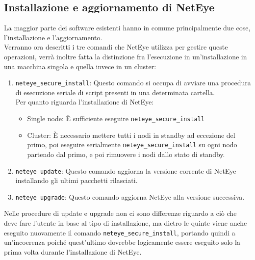 \subsection{Installazione e aggiornamento di NetEye}
\label{sub:install_update} La maggior parte dei software esistenti hanno in comune
principalmente due cose, l'installazione e l'aggiornamento.\\ Verranno ora
descritti i tre comandi che NetEye utilizza per gestire queste operazioni, verrà
inoltre fatta la distinzione fra l'esecuzione in un'installazione in una macchina
singola e quella invece in un cluster:
\begin{enumerate}
  \item \texttt{neteye\_secure\_install}: Questo comando si occupa di avviare una
    procedura di esecuzione seriale di script presenti in una determinata cartella.\\
    Per quanto riguarda l'installazione di NetEye:
    \begin{itemize}
      \item Single node: È sufficiente eseguire \texttt{neteye\_secure\_install}

      \item Cluster: È necessario mettere tutti i nodi in standby ad eccezione
        del primo, poi eseguire serialmente \texttt{neteye\_secure\_install} su
        ogni nodo partendo dal primo, e poi rimuovere i nodi dallo stato di standby.
    \end{itemize}

  \item \texttt{neteye update}: Questo comando aggiorna la versione corrente di NetEye
    installando gli ultimi pacchetti rilasciati.\\

  \item \texttt{neteye upgrade}: Questo comando aggiorna NetEye alla versione successiva.
\end{enumerate}
Nelle procedure di update e upgrade non ci sono differenze riguardo a ciò che
deve fare l'utente in base al tipo di installazione, ma dietro le quinte viene anche
eseguito nuovamente il comando \texttt{neteye\_secure\_install}, portando quindi
a un'incoerenza poiché quest'ultimo dovrebbe logicamente essere eseguito solo la
prima volta durante l'installazione di NetEye.


